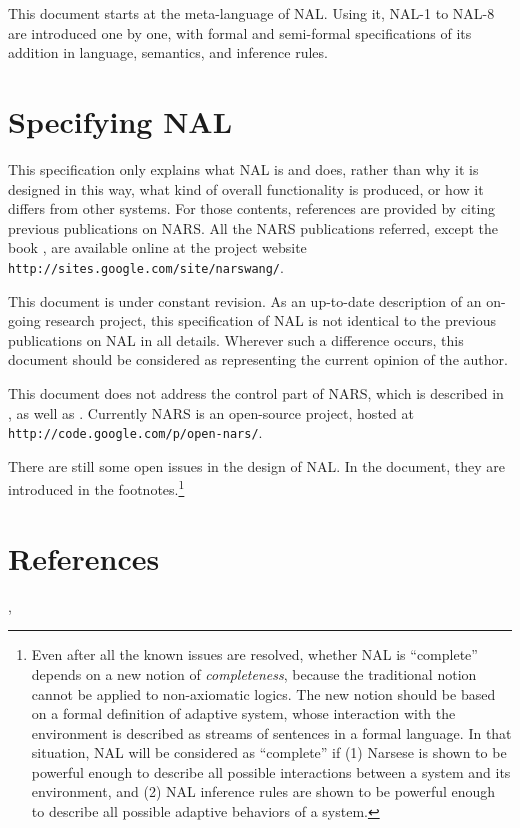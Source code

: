This document starts at the meta-language of NAL. Using it, NAL-1 to NAL-8 are introduced one by one, with formal and semi-formal specifications of its addition in language, semantics, and inference rules. 

\section{Specifying NAL}

This specification only explains what NAL is and does, rather than why it is designed in this way, what kind of overall functionality is produced, or how it differs from other systems. For those contents, references are provided by citing previous publications on NARS. All the NARS publications referred, except the book \cite{wp:book1}, are available online at the project website \texttt{http://sites.google.com/site/narswang/}. 

This document is under constant revision. As an up-to-date description of an on-going research project, this specification of NAL is not identical to the previous publications on NAL in all details. Wherever such a difference occurs, this document should be considered as representing the current opinion of the author.

This document does not address the control part of NARS, which is described in \cite[Chapter 6]{wp:book1}, as well as \cite{wp:reso2,wp:reso3,wp:CBC}. Currently NARS is an open-source project, hosted at \\
\texttt{http://code.google.com/p/open-nars/}.

There are still some open issues in the design of NAL. In the document, they are introduced in the footnotes.\footnote{Even after all the known issues are resolved, whether NAL is ``complete'' depends on a new notion of \emph{completeness}, because the traditional notion cannot be applied to non-axiomatic logics. The new notion should be based on a formal definition of adaptive system, whose interaction with the environment is described as streams of sentences in a formal language. In that situation, NAL will be considered as ``complete'' if (1) Narsese is shown to be powerful enough to describe all possible interactions between a system and its environment, and (2) NAL inference rules are shown to be powerful enough to describe all possible adaptive behaviors of a system.}

\section*{References}

\cite[Chapter 2]{wp:book1}, \cite{wp:phd,wp:roadmap}
